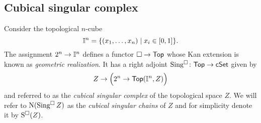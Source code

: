 \subsection{Cubical singular complex}

Consider the topological $n$-cube
\begin{equation*}
\mathbb{I}^{n} = \{(x_1, \dots, x_n) \mid x_i \in [0,1]\}.
\end{equation*}
The assignment $2^n \to \mathbb{I}^n$ defines a functor $\square \to \mathsf{Top}$ whose Kan extension is known as \textit{geometric realization}.
It has a right adjoint $\operatorname{Sing^{\square}} \colon \mathsf{Top} \to \mathsf{cSet}$ given by
\begin{equation*}
Z \to \Big(2^n \to \mathsf{Top}(\mathbb{I}^n, Z)\Big)
\end{equation*}
and referred to as the \textit{cubical singular complex} of the topological space $Z$.
We will refer to $\operatorname{N}(\operatorname{Sing^{\square}} Z)$ as the \textit{cubical singular chains} of $Z$ and for simplicity denote it by $\operatorname{S^{\square}}(Z)$.